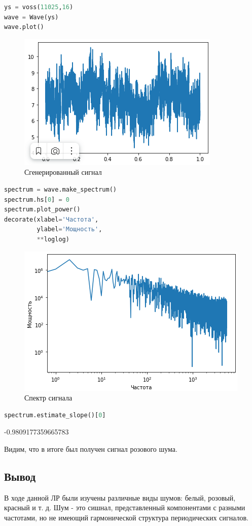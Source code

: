 \begin{lstlisting}[language=Python]
ys = voss(11025,16)
wave = Wave(ys)
wave.plot()
\end{lstlisting}

\begin{figure}[H]
	\begin{center}
		\includegraphics[scale=1]{fig/lab04/lab4_7.png}
		\caption{Сгенерированный сигнал}
	\end{center}
\end{figure}

\begin{lstlisting}[language=Python]
spectrum = wave.make_spectrum()
spectrum.hs[0] = 0
spectrum.plot_power()
decorate(xlabel='Частота',
         ylabel='Мощность',
         **loglog)
\end{lstlisting}
\begin{figure}[H]
	\begin{center}
		\includegraphics[scale=1]{fig/lab04/lab4_8.png}
		\caption{Спектр сигнала}
	\end{center}
\end{figure}

\begin{lstlisting}[language=Python]
spectrum.estimate_slope()[0]
\end{lstlisting}

-0.9809177359665783

\noindent Видим, что в итоге был получен сигнал розового шума.

\subsection{Вывод}

В ходе данной ЛР были изучены различные виды шумов: белый, розовый, красный и т. д. Шум - это сишнал, представленный компонентами с разными частотами, но не имеющий гармонической структура периодических сигналов.
